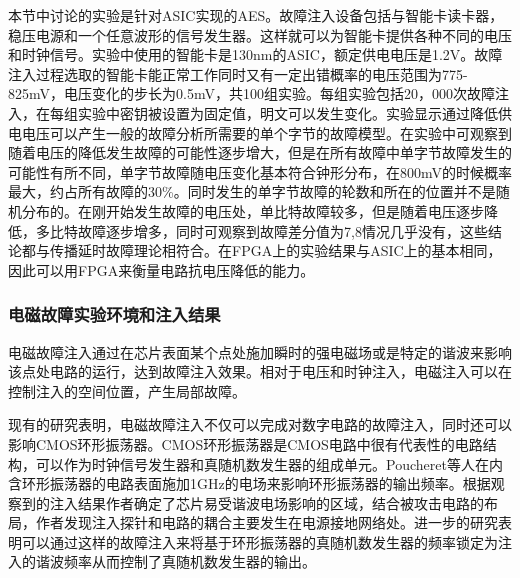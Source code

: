 \documentclass[a4paper,12pt]{article}
\begin{document}
\begin{CJK}{UTF8}{gkai}
本节中讨论的实验是针对ASIC实现的AES。故障注入设备包括与智能卡读卡器，稳压电源和一个任意波形的信号发生器。这样就可以为智能卡提供各种不同的电压和时钟信号。实验中使用的智能卡是130nm的ASIC，额定供电电压是1.2V。故障注入过程选取的智能卡能正常工作同时又有一定出错概率的电压范围为775-825mV，电压变化的步长为0.5mV，共100组实验。每组实验包括20，000次故障注入，在每组实验中密钥被设置为固定值，明文可以发生变化。实验显示通过降低供电电压可以产生一般的故障分析所需要的单个字节的故障模型。在实验中可观察到随着电压的降低发生故障的可能性逐步增大，但是在所有故障中单字节故障发生的可能性有所不同，单字节故障随电压变化基本符合钟形分布，在800mV的时候概率最大，约占所有故障的30\%。同时发生的单字节故障的轮数和所在的位置并不是随机分布的。在刚开始发生故障的电压处，单比特故障较多，但是随着电压逐步降低，多比特故障逐步增多，同时可观察到故障差分值为7,8情况几乎没有，这些结论都与传播延时故障理论相符合。在FPGA上的实验结果与ASIC上的基本相同，因此可以用FPGA来衡量电路抗电压降低的能力。

\subsubsection{电磁故障实验环境和注入结果}

电磁故障注入通过在芯片表面某个点处施加瞬时的强电磁场或是特定的谐波来影响该点处电路的运行，达到故障注入效果。相对于电压和时钟注入，电磁注入可以在控制注入的空间位置，产生局部故障。

现有的研究表明，电磁故障注入不仅可以完成对数字电路的故障注入，同时还可以影响CMOS环形振荡器。CMOS环形振荡器是CMOS电路中很有代表性的电路结构，可以作为时钟信号发生器和真随机数发生器的组成单元。Poucheret等人在内含环形振荡器的电路表面施加1GHz的电场来影响环形振荡器的输出频率。根据观察到的注入结果作者确定了芯片易受谐波电场影响的区域，结合被攻击电路的布局，作者发现注入探针和电路的耦合主要发生在电源接地网络处。进一步的研究表明可以通过这样的故障注入来将基于环形振荡器的真随机数发生器的频率锁定为注入的谐波频率从而控制了真随机数发生器的输出。


\end{CJK}
\end{document}
